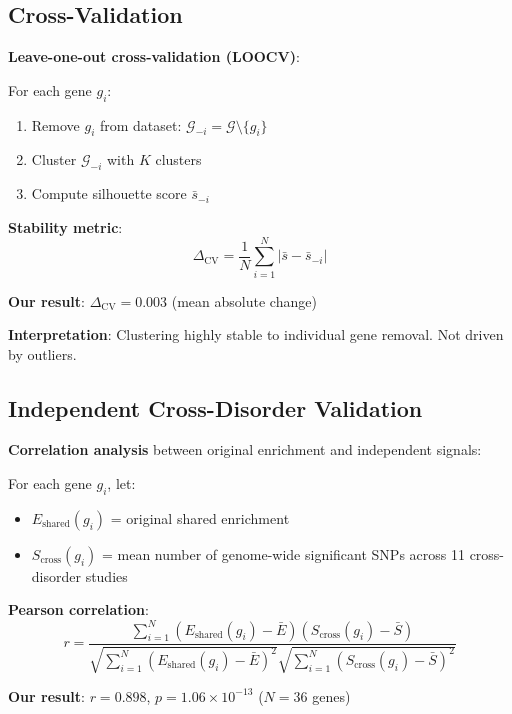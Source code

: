 \documentclass[12pt,letterpaper]{article}
\theoremstyle{definition}
\theoremstyle{remark}
\begin{document}
\subsection{Cross-Validation}

\textbf{Leave-one-out cross-validation (LOOCV)}:

For each gene $g_i$:
\begin{enumerate}
    \item Remove $g_i$ from dataset: $\mathcal{G}_{-i} = \mathcal{G} \setminus \{g_i\}$
    \item Cluster $\mathcal{G}_{-i}$ with $K$ clusters
    \item Compute silhouette score $\bar{s}_{-i}$
\end{enumerate}

\textbf{Stability metric}:
\begin{equation}
\Delta_{\text{CV}} = \frac{1}{N} \sum_{i=1}^N |\bar{s} - \bar{s}_{-i}|
\end{equation}

\textbf{Our result}: $\Delta_{\text{CV}} = 0.003$ (mean absolute change)

\textbf{Interpretation}: Clustering highly stable to individual gene removal. Not driven by outliers.

\subsection{Independent Cross-Disorder Validation}

\textbf{Correlation analysis} between original enrichment and independent signals:

For each gene $g_i$, let:
\begin{itemize}
    \item $E_{\text{shared}}(g_i)$ = original shared enrichment
    \item $S_{\text{cross}}(g_i)$ = mean number of genome-wide significant SNPs across 11 cross-disorder studies
\end{itemize}

\textbf{Pearson correlation}:
\begin{equation}
r = \frac{\sum_{i=1}^N (E_{\text{shared}}(g_i) - \bar{E})(S_{\text{cross}}(g_i) - \bar{S})}{\sqrt{\sum_{i=1}^N (E_{\text{shared}}(g_i) - \bar{E})^2} \sqrt{\sum_{i=1}^N (S_{\text{cross}}(g_i) - \bar{S})^2}}
\end{equation}

\textbf{Our result}: $r = 0.898$, $p = 1.06 \times 10^{-13}$ ($N=36$ genes)
\end{document}
